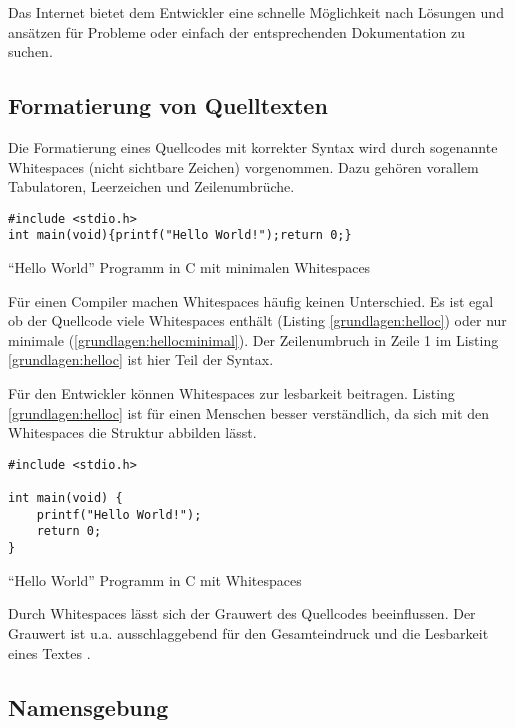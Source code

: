 Das Internet bietet dem Entwickler eine schnelle Möglichkeit nach Lösungen und
ansätzen für Probleme oder einfach der entsprechenden Dokumentation zu suchen.

\subsection{Formatierung von Quelltexten}

Die Formatierung eines Quellcodes mit korrekter Syntax wird durch
sogenannte Whitespaces (nicht sichtbare Zeichen) vorgenommen.
Dazu gehören vorallem Tabulatoren, Leerzeichen und Zeilenumbrüche.

\begin{listing}[H]
    \begin{verbatim}
#include <stdio.h>
int main(void){printf("Hello World!");return 0;}
    \end{verbatim}
    \caption{\enquote{Hello World} Programm in C mit minimalen Whitespaces}
    \label{grundlagen:hellocminimal}
\end{listing}

Für einen Compiler machen Whitespaces häufig keinen Unterschied.
Es ist egal ob der Quellcode viele Whitespaces enthält (Listing \ref{grundlagen:helloc})
oder nur minimale (\ref{grundlagen:hellocminimal}).
Der Zeilenumbruch in Zeile 1 im Listing \ref{grundlagen:helloc} ist hier Teil der Syntax.

Für den Entwickler können Whitespaces zur lesbarkeit beitragen. Listing \ref{grundlagen:helloc}
ist für einen Menschen besser verständlich, da sich mit den Whitespaces die Struktur abbilden lässt.

\begin{listing}[H]
    \begin{verbatim}
#include <stdio.h>

int main(void) {
    printf("Hello World!");
    return 0;
}
    \end{verbatim}
    \caption{\enquote{Hello World} Programm in C mit Whitespaces}
    \label{grundlagen:helloc}
\end{listing}

Durch Whitespaces lässt sich der Grauwert des Quellcodes beeinflussen.
Der Grauwert ist u.a. ausschlaggebend für den Gesamteindruck und die Lesbarkeit
eines Textes \cite{Beinert}.

\subsection{Namensgebung}

